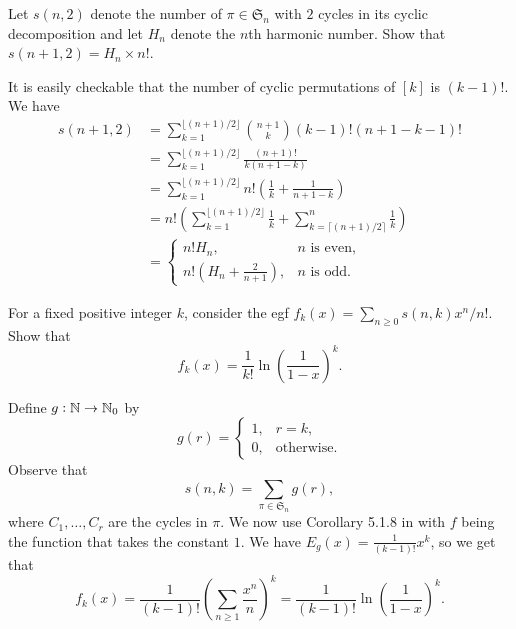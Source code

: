 		\begin{problem}
			Let $s(n,2)$ denote the number of $\pi \in \mathfrak{S}_n$ with $2$ cycles in its cyclic decomposition and let $H_n$ denote the $n$th harmonic number. Show that $s(n+1,2) = H_n \times n!$.
		\end{problem}
		\begin{solution*}
			It is easily checkable that the number of cyclic permutations of $[k]$ is $(k-1)!$. We have
			\begin{align*}
				s(n+1,2) &= \sum_{k=1}^{\lfloor (n+1)/2 \rfloor} \binom{n+1}{k} (k-1)! (n+1-k-1)! \\
					&= \sum_{k=1}^{\lfloor (n+1)/2 \rfloor} \frac{(n+1)!}{k(n+1-k)} \\
					&= \sum_{k=1}^{\lfloor (n+1)/2 \rfloor} n! \left( \frac{1}{k} + \frac{1}{n+1-k} \right) \\
					&= n! \left(\sum_{k=1}^{\lfloor (n+1)/2 \rfloor} \frac{1}{k} + \sum_{k=\lceil (n+1)/2 \rceil}^{n} \frac{1}{k} \right) \\
					&= \begin{cases} n!H_n, & \text{$n$ is even}, \\ n! (H_n + \frac{2}{n+1}), & \text{$n$ is odd.} \end{cases} 
			\end{align*}
		\end{solution*}

		\begin{problem}
			For a fixed positive integer $k$, consider the egf $f_k(x) = \sum_{n \ge 0} s(n,k) x^n/n!$. Show that
			\[ f_k(x) = \frac{1}{k!} \ln\left( \frac{1}{1-x} \right)^k. \]
		\end{problem}
		\begin{solution*}
			Define $g : \mathbb{N} \to \mathbb{N}_0$ by
			\[ g(r) = \begin{cases} 1, & r = k, \\ 0, & \text{otherwise.} \end{cases} \]
			Observe that
			\[ s(n,k) = \sum_{\pi \in \mathfrak{S}_n} g(r), \]
			where $C_1,\ldots,C_r$ are the cycles in $\pi$. We now use Corollary 5.1.8 in \cite{ec2} with $f$ being the function that takes the constant $1$. We have $E_g(x) = \frac{1}{(k-1)!} x^k$, so we get that
			\[ f_k(x) = \frac{1}{(k-1)!} \left( \sum_{n \ge 1} \frac{x^n}{n} \right)^k = \frac{1}{(k-1)!} \ln \left( \frac{1}{1-x} \right)^k. \]
		\end{solution*}

